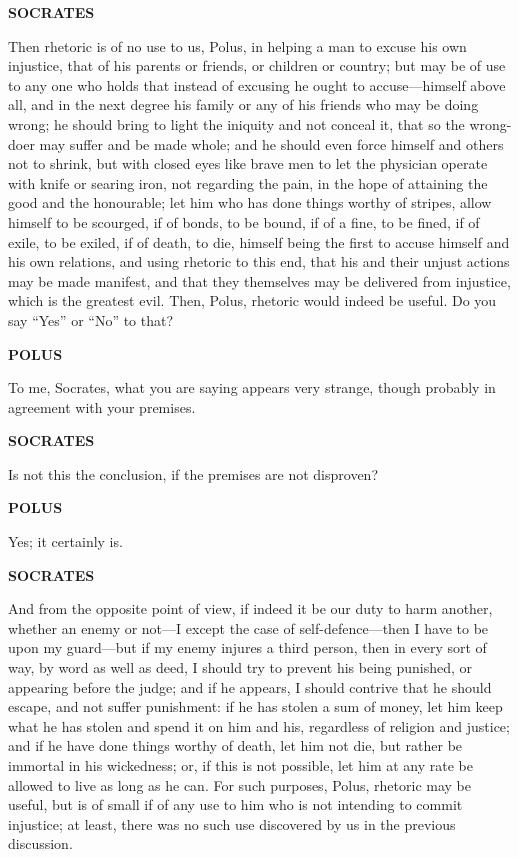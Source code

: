 \documentclass[11pt,letter]{article}
\begin{document}
\par \textbf{SOCRATES}
\par   Then rhetoric is of no use to us, Polus, in helping a man to excuse his own injustice, that of his parents or friends, or children or country; but may be of use to any one who holds that instead of excusing he ought to accuse—himself above all, and in the next degree his family or any of his friends who may be doing wrong; he should bring to light the iniquity and not conceal it, that so the wrong-doer may suffer and be made whole; and he should even force himself and others not to shrink, but with closed eyes like brave men to let the physician operate with knife or searing iron, not regarding the pain, in the hope of attaining the good and the honourable; let him who has done things worthy of stripes, allow himself to be scourged, if of bonds, to be bound, if of a fine, to be fined, if of exile, to be exiled, if of death, to die, himself being the first to accuse himself and his own relations, and using rhetoric to this end, that his and their unjust actions may be made manifest, and that they themselves may be delivered from injustice, which is the greatest evil. Then, Polus, rhetoric would indeed be useful. Do you say “Yes” or “No” to that?

\par \textbf{POLUS}
\par   To me, Socrates, what you are saying appears very strange, though probably in agreement with your premises.

\par \textbf{SOCRATES}
\par   Is not this the conclusion, if the premises are not disproven?

\par \textbf{POLUS}
\par   Yes; it certainly is.

\par \textbf{SOCRATES}
\par   And from the opposite point of view, if indeed it be our duty to harm another, whether an enemy or not—I except the case of self-defence—then I have to be upon my guard—but if my enemy injures a third person, then in every sort of way, by word as well as deed, I should try to prevent his being punished, or appearing before the judge; and if he appears, I should contrive that he should escape, and not suffer punishment:  if he has stolen a sum of money, let him keep what he has stolen and spend it on him and his, regardless of religion and justice; and if he have done things worthy of death, let him not die, but rather be immortal in his wickedness; or, if this is not possible, let him at any rate be allowed to live as long as he can. For such purposes, Polus, rhetoric may be useful, but is of small if of any use to him who is not intending to commit injustice; at least, there was no such use discovered by us in the previous discussion.
\end{document}
